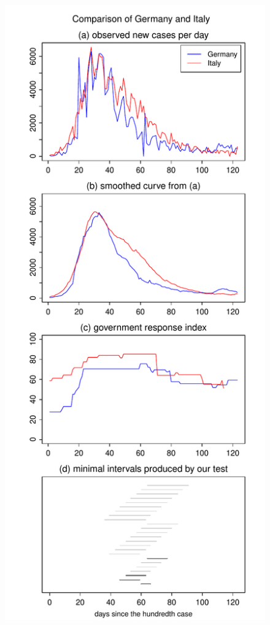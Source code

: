 \documentclass[a4paper,12pt]{article}
\numberwithin{equation}{section}
\begin{document}
\begin{figure}[p!]
\begin{minipage}[t]{0.49\textwidth}
\includegraphics[width=\textwidth]{plots/DEU_vs_ITA}

\end{minipage}
\end{figure}
\end{document}
